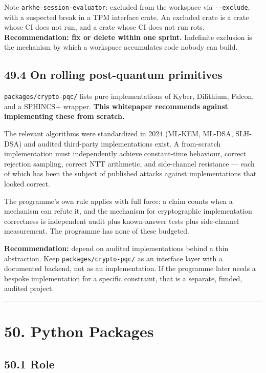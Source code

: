 \documentclass[
  11pt]{report}
\begin{document}
Note \texttt{arkhe-session-evaluator}: excluded from the workspace via
\texttt{-\/-exclude}, with a suspected break in a TPM interface crate.
An excluded crate is a crate whose CI does not run, and a crate whose CI
does not run rots. \textbf{Recommendation: fix or delete within one
sprint.} Indefinite exclusion is the mechanism by which a workspace
accumulates code nobody can build.

\hypertarget{on-rolling-post-quantum-primitives}{%
\section{49.4 On rolling post-quantum
primitives}\label{on-rolling-post-quantum-primitives}}

\texttt{packages/crypto-pqc/} lists pure implementations of Kyber,
Dilithium, Falcon, and a SPHINCS+ wrapper. \textbf{This whitepaper
recommends against implementing these from scratch.}

The relevant algorithms were standardized in 2024 (ML-KEM, ML-DSA,
SLH-DSA) and audited third-party implementations exist. A from-scratch
implementation must independently achieve constant-time behaviour,
correct rejection sampling, correct NTT arithmetic, and side-channel
resistance --- each of which has been the subject of published attacks
against implementations that looked correct.

The programme's own rule applies with full force: a claim counts when a
mechanism can refute it, and the mechanism for cryptographic
implementation correctness is independent audit plus known-answer tests
plus side-channel measurement. The programme has none of these budgeted.

\textbf{Recommendation:} depend on audited implementations behind a thin
abstraction. Keep \texttt{packages/crypto-pqc/} as an interface layer
with a documented backend, not as an implementation. If the programme
later needs a bespoke implementation for a specific constraint, that is
a separate, funded, audited project.

\begin{center}\rule{0.5\linewidth}{0.5pt}\end{center}

\hypertarget{python-packages}{%
\chapter{50. Python Packages}\label{python-packages}}

\hypertarget{role-1}{%
\section{50.1 Role}\label{role-1}}
\end{document}
